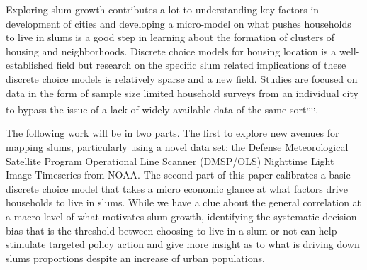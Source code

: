 Exploring slum growth contributes a lot to understanding key factors in development of cities and developing a micro-model on what pushes households to live in slums is a good step in learning about the formation of clusters of housing and neighborhoods. Discrete choice models for housing location is a well-established field\textsuperscript{\cite{Mackay}} but research on the specific slum related implications of these discrete choice models is relatively sparse and a new field. Studies are focused on data in the form of sample size limited household surveys from an individual city to bypass the issue of a lack of widely available data of the same sort\textsuperscript{\cite{Badmos},\cite{Celhay},\cite{Deeyah},\cite{Roy},\cite{Das}}.


The following work will be in two parts. The first to explore new avenues for mapping slums, particularly using a novel data set: the Defense Meteorological Satellite Program Operational Line Scanner (DMSP/OLS) Nighttime Light Image Timeseries from NOAA. The second part of this paper calibrates a basic discrete choice model that takes a micro economic glance at what factors drive households to live in slums. While we have a clue about the general correlation at a macro level of what motivates slum growth, identifying the systematic decision bias that is the threshold between choosing to live in a slum or not can help stimulate targeted policy action and give more insight as to what is driving down slums proportions despite an increase of urban populations.
